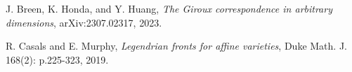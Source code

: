 \documentclass[11pt]{amsart}
\begin{document}
\begin{thebibliography}{}
\begin{comment}
\bibitem[BEE11]{BEE:Product}
F. Bourgeois, T. Ekholm, and Y. Eliashberg, \textit{Symplectic homology product via Legendrian surgery}, PNAS Volume 108, Number 20, p.8114-8121, 2011.

\bibitem[BEE12]{BEE:LegendrianSurgery}
F. Bourgeois, T. Ekholm, and Y. Eliashberg, \textit{Effect of Legendrain Surgery}, Geom. Topol., Volume 16, Number 1, p.301-389, 2012.

\bibitem[BEHW03]{SFTCompactness}
F. Bourgeois, Y. Eliashberg, H. Hofer, and K. Wysocki, \textit{Compactness results in symplectic field theory}, Geom. Topol., Volume 7, Number 2, p.799-888, 2003.

\bibitem[BN10]{AlgebraicallyOvertwisted}
F. Bourgeois and K. Niederkr{\"u}ger, Towards a good definition of algebraically overtwisted,
Expo. Math. 28, no. 1, 85–100, 2010.

\bibitem[BO09a]{BO:MorseBott}
F. Bourgeois and A. Oancea, \textit{Symplectic homology, autonomous Hamiltonians, and Morse–Bott moduli spaces}, Duke Math. J. 146, p.71–174, 2009.

\bibitem[BO09b]{BO:ExactSequence}
F. Bourgeois and A. Oancea, \textit{An exact sequence for contact- and symplectic homology},
Invent. math., Volume 175, p. 611–680, 2009.

\bibitem[BT82]{BottTu}
R. Bott and L. R. Tu, \textit{Differential forms in algebraic topology}, Graduate Texts in Mathematics 82, Springer-Verlag, 1982.
\end{comment}

J. Breen, K. Honda, and Y. Huang, \textit{The Giroux correspondence in arbitrary dimensions}, arXiv:2307.02317, 2023.

\begin{comment}
\bibitem[CGKS14]{CGKS:Polyfilling}
C. Cao, N. Gallup, K. Hayden, J. M. Sabloff, \textit{Topologically Distinct Lagrangian and Symplectic Fillings}, Math. Research Letters, Vol. 21, p.85-99, 2014.

\bibitem[CMP19]{CMP:OT}
R. Casals, E. Murphy, and F. Presas, \textit{Geometric criteria for overtwistedness}, J. Amer. Math. Soc. 32, p.563–604, 2019.
\end{comment}

R. Casals and E. Murphy, \textit{Legendrian fronts for affine varieties}, Duke Math. J. 168(2): p.225-323, 2019.


\begin{comment}
\bibitem[CG86]{CG:Cobordisms}
A. Casson, C. M. Gordon, \textit{Cobordism of classical knots}, from: "{\'A} la recherche de la topologie perdue" (editors L Guillou, A Marin), Progr. Math. 62, Birkh{\"a}user 181, 1986.


\end{comment}
\end{thebibliography}
\end{document}

